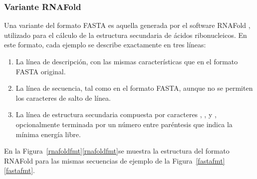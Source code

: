 %
\subsubsection{Variante RNAFold}
%
Una variante del formato FASTA es aquella generada por el software
RNAFold \cite{vienna}, utilizado para el cálculo de la estructura
secundaria de ácidos ribonucleicos. En este formato, cada ejemplo se
describe exactamente en tres líneas:
%
\begin{enumerate}
\item La línea de descripción, con las mismas características que
  en el formato FASTA original.
\item La línea de secuencia, tal como en el formato FASTA, aunque
  no se permiten los caracteres de salto de línea.
\item La línea de estructura secundaria compuesta por caracteres
  \mono{(}, \mono{)}, y , opcionalmente terminada por un
  número entre paréntesis que indica la mínima energía libre.
\end{enumerate}
%
En la \iflatexml{}Figura~\ref{rnafoldfmt}\else\autoref{rnafoldfmt}\fi se
muestra la estructura del formato RNAFold para las mismas secuencias de ejemplo de
la \iflatexml{}Figura~\ref{fastafmt}\else\autoref{fastafmt}\fi.
